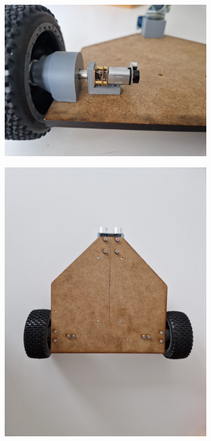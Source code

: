 \begin{figure}[H]
\centering
\begin{subfigure}{0.32\textwidth}
\centering
\includegraphics[width=0.95\linewidth]{assets/prototyp-fahrwerk/fahrwerk-motoren.jpeg} 
\end{subfigure}
\begin{subfigure}{0.32\textwidth}
\centering
\includegraphics[width=0.95\linewidth]{assets/prototyp-fahrwerk/fahrwerk-oben.jpeg} 

\end{subfigure}
\end{figure}
